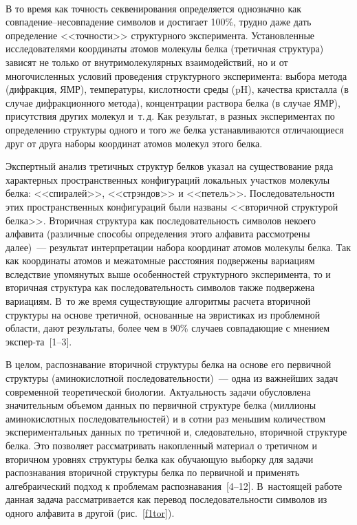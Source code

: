 \begin{multicols}{2}
\begin{figure*} %
\vspace*{1pt}
\begin{center}
\mbox{%
\epsfxsize=164.044mm
}
\end{center}
\vspace*{-9pt}
\end{figure*}

    В то время как точность секвенирования определяется однозначно как 
сов\-па\-де\-ние--не\-сов\-па\-де\-ние символов и достигает 100\%, трудно даже 
дать определение <<точности>> структурного эксперимента. Установленные 
исследователями координаты атомов молекулы белка (третичная структура) 
зависят не только от внутримолекулярных взаимодействий, но и от 
многочисленных условий проведения структурного эксперимента: выбора 
метода (дифракция, ЯМР), температуры, кислотности среды (pH), качества 
кристалла (в случае дифракционного метода), концентрации раствора белка (в 
случае ЯМР), присутствия других молекул и~т.\,д. Как результат, в разных 
экспериментах по определению структуры одного и того же белка 
устанавливаются отличающиеся друг от друга наборы  координат атомов 
молекул этого белка. 

    Экспертный анализ третичных структур белков указал на существование 
ряда характерных пространственных конфигураций локальных участков 
молекулы белка: <<спиралей>>, <<стрэндов>> и <<петель>>. 
Последовательности этих пространственных конфигураций были названы 
<<вторичной структурой белка>>. Вторичная структура как 
последовательность символов некоего алфавита (различные способы 
определения этого алфавита  рассмотрены далее)~--- результат интерпретации 
набора координат атомов молекулы белка. Так как координаты атомов и 
межатомные расстояния подвержены вариациям вследствие упомянутых выше 
особен\-ностей структурного эксперимента, то и вторичная структура как 
последовательность символов также подвержена вариациям. В~то же время 
существующие алгоритмы расчета вторичной структуры на основе третичной, 
основанные на эвристиках из проблемной области, дают результаты, более чем 
в 90\% случаев совпадающие с мнением экс\-пер-\linebreak та~[1--3]. 
    
В целом, распознавание вторичной структуры белка на основе его первичной 
структуры (амино\-кислотной последовательности)~--- одна из важней\-ших задач  
современной теоретической биологии. Актуальность задачи обусловлена 
значительным объемом данных по первичной структуре белка (миллионы 
аминокислотных последовательностей) и в сотни раз меньшим количеством 
экспериментальных данных по третичной и, следовательно, вторичной 
структуре белка. Это позволяет рассматривать накопленный материал о 
третичном и вторичном уровнях структуры белка как обуча\-ющую выборку для 
задачи распознавания вторичной структуры белка по первичной и применять 
алгебраический подход к проблемам распознавания~[4--12].  В~настоящей 
работе данная задача рассматривается как перевод последовательности 
символов из одного алфавита в другой (рис.~\ref{f1tor}).


\end{multicols}
